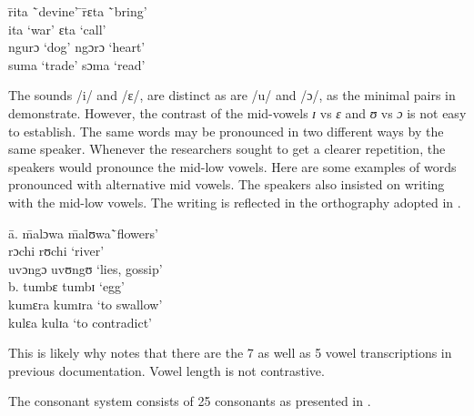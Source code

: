 \documentclass[output=paper,colorlinks,citecolor=brown]{langscibook}
\begin{document}
\ea%
    \label{ex:ngonyani:1}
    \begin{tabbing}
        \= rita \quad\= `devine' \quad\= \quad\=  rɛta \quad\= `bring'\\
        \> ita \> `war' \> \> ɛta \> `call'\\
        \> ngurɔ \> `dog' \> \> ngɔrɔ \> `heart' \\
        \> suma \> `trade' \> \> sɔma \> `read'
\end{tabbing}
\z

The sounds /i/ and /ɛ/, are distinct as are /u/ and /ɔ/, as the minimal pairs  in  demonstrate. However, the contrast of the mid-vowels  \textit{ɪ} vs \textit{ɛ} and \textit{ʊ} vs \textit{ɔ} is not  easy to establish. The  same words may be pronounced  in two different ways by the same speaker. Whenever  the researchers sought  to get a clearer  repetition,  the speakers would  pronounce  the mid-low vowels. Here are some examples of words pronounced with alternative mid vowels. The  speakers also insisted  on writing  with  the mid-low vowels. The writing  is reflected  in the orthography adopted in \cite{RugemaliraEtAl2019}.

\ea%
    \label{ex:ngonyani:2}
    \begin{tabbing}
        \= a. \quad\= malɔwa \quad\= malʊwa\quad\= `flowers'\\
        \> \> rɔchi \> rʊchi  \>  `river' \\
        \> \> uvɔngɔ \> uvʊngʊ \> `lies, gossip'\\
        \> b. \>  tumbɛ \> tumbɪ \> `egg' \\
        \> \> kumɛra \> kumɪra \> `to swallow'\\
        \> \> kulɛa \> kulɪa \> `to contradict'
    \end{tabbing}
\z

This is likely why \cite{Nurse2000} notes that there are the 7 as well as 5 vowel transcriptions in previous documentation. Vowel length is not contrastive.

The consonant system consists of 25 consonants as presented in . 
\end{document}
